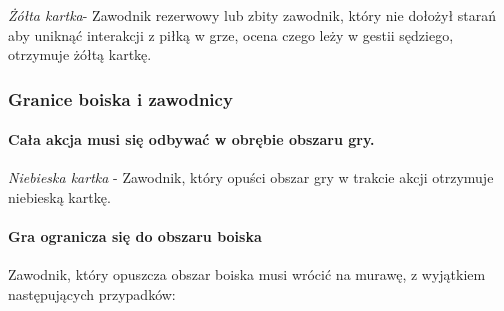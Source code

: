 \documentclass[12pt]{article}
\begin{document}
\emph{Żółta kartka}- Zawodnik rezerwowy lub zbity zawodnik, który nie
dołożył starań aby uniknąć interakcji z piłką w grze, ocena czego leży w
gestii sędziego, otrzymuje żółtą kartkę.

\subsubsection{Granice boiska i zawodnicy}

\paragraph{Cała akcja musi się odbywać w obrębie obszaru gry.}

\emph{Niebieska kartka} - Zawodnik, który opuści obszar gry w trakcie
akcji otrzymuje niebieską kartkę.

\paragraph{Gra ogranicza się do obszaru boiska}
Zawodnik, który
opuszcza obszar boiska musi wrócić na murawę, z wyjątkiem następujących
przypadków:
\end{document}
